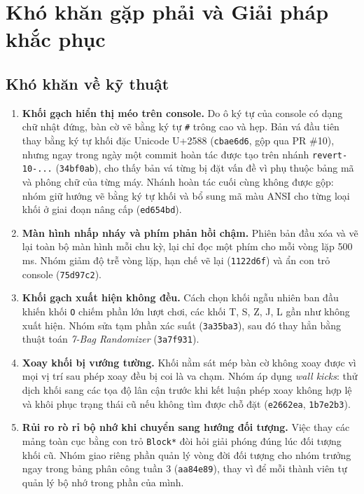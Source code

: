 \section{Khó khăn gặp phải và Giải pháp khắc phục}
\label{sec:kho_khan_va_giai_phap}

\subsection{Khó khăn về kỹ thuật}
\label{sec:kho_khan_ky_thuat}

\begin{enumerate}
    \item \textbf{Khối gạch hiển thị méo trên console.} Do ô ký tự của console có dạng chữ nhật đứng, bàn cờ vẽ bằng ký tự \texttt{\#} trông cao và hẹp. Bản vá đầu tiên thay bằng ký tự khối đặc Unicode U+2588 (\texttt{cbae6d6}, gộp qua PR \#10), nhưng ngay trong ngày một commit hoàn tác được tạo trên nhánh \texttt{revert-10-...} (\texttt{34bf0ab}), cho thấy bản vá từng bị đặt vấn đề vì phụ thuộc bảng mã và phông chữ của từng máy. Nhánh hoàn tác cuối cùng không được gộp: nhóm giữ hướng vẽ bằng ký tự khối và bổ sung mã màu ANSI cho từng loại khối ở giai đoạn nâng cấp (\texttt{ed654bd}).

    \item \textbf{Màn hình nhấp nháy và phím phản hồi chậm.} Phiên bản đầu xóa và vẽ lại toàn bộ màn hình mỗi chu kỳ, lại chỉ đọc một phím cho mỗi vòng lặp 500\,ms. Nhóm giảm độ trễ vòng lặp, hạn chế vẽ lại (\texttt{1122d6f}) và ẩn con trỏ console (\texttt{75d97c2}).

    \item \textbf{Khối gạch xuất hiện không đều.} Cách chọn khối ngẫu nhiên ban đầu khiến khối \texttt{O} chiếm phần lớn lượt chơi, các khối T, S, Z, J, L gần như không xuất hiện. Nhóm sửa tạm phần xác suất (\texttt{3a35ba3}), sau đó thay hẳn bằng thuật toán \textit{7-Bag Randomizer} (\texttt{3a7f931}).

    \item \textbf{Xoay khối bị vướng tường.} Khối nằm sát mép bàn cờ không xoay được vì mọi vị trí sau phép xoay đều bị coi là va chạm. Nhóm áp dụng \textit{wall kicks}: thử dịch khối sang các tọa độ lân cận trước khi kết luận phép xoay không hợp lệ và khôi phục trạng thái cũ nếu không tìm được chỗ đặt (\texttt{e2662ea}, \texttt{1b7e2b3}).

    \item \textbf{Rủi ro rò rỉ bộ nhớ khi chuyển sang hướng đối tượng.} Việc thay các mảng toàn cục bằng con trỏ \texttt{Block*} đòi hỏi giải phóng đúng lúc đối tượng khối cũ. Nhóm giao riêng phần quản lý vòng đời đối tượng cho nhóm trưởng ngay trong bảng phân công tuần 3 (\texttt{aa84e89}), thay vì để mỗi thành viên tự quản lý bộ nhớ trong phần của mình.


\end{enumerate}
